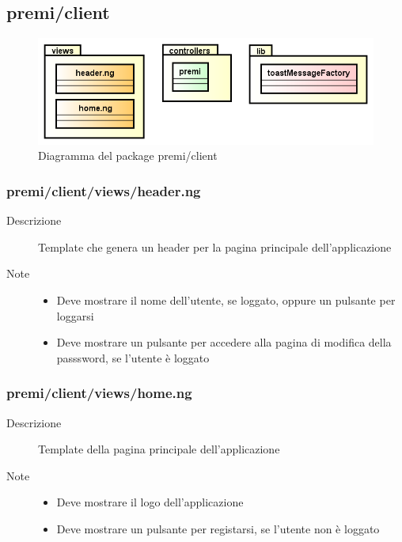 \clearpage
\subsection{premi/client}
\begin{figure}[H]
\begin{center}
\includegraphics[scale=0.50]{img/diapkg/client.png}
\caption{Diagramma del package premi/client}
\end{center}
\end{figure}


\subsubsection{premi/client/views/header.ng}

\begin{description}
\item[Descrizione] \hfill
	Template che genera un header per la pagina principale dell'applicazione
	\item[Note] \hfill
	\begin{itemize}
			\item Deve mostrare il nome dell'utente, se loggato, oppure un pulsante per loggarsi
			\item Deve mostrare un pulsante per accedere alla pagina di modifica della passsword, se l'utente è loggato
	\end{itemize}
\end{description}

\subsubsection{premi/client/views/home.ng}

\begin{description}
\item[Descrizione] \hfill
	Template della pagina principale dell'applicazione
	\item[Note] \hfill
	\begin{itemize}
			\item Deve mostrare il logo dell'applicazione
			\item Deve mostrare un pulsante per registarsi, se l'utente non è loggato
	\end{itemize}
\end{description}

